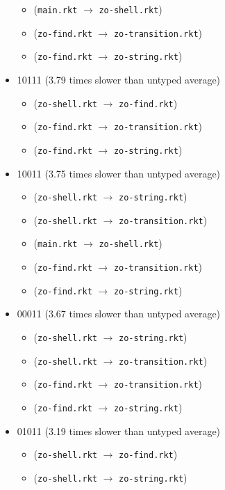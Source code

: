\documentclass{article}
\newcommand{\mono}[1]{\texttt{#1}}
\begin{document}
\begin{itemize}
\begin{itemize}
  \item (\mono{main.rkt} $\rightarrow$ \mono{zo-shell.rkt})
  \item (\mono{zo-find.rkt} $\rightarrow$ \mono{zo-transition.rkt})
  \item (\mono{zo-find.rkt} $\rightarrow$ \mono{zo-string.rkt})
  \end{itemize}
\item 10111 (3.79 times slower than untyped average)
  \begin{itemize}
  \item (\mono{zo-shell.rkt} $\rightarrow$ \mono{zo-find.rkt})
  \item (\mono{zo-find.rkt} $\rightarrow$ \mono{zo-transition.rkt})
  \item (\mono{zo-find.rkt} $\rightarrow$ \mono{zo-string.rkt})
  \end{itemize}
\item 10011 (3.75 times slower than untyped average)
  \begin{itemize}
  \item (\mono{zo-shell.rkt} $\rightarrow$ \mono{zo-string.rkt})
  \item (\mono{zo-shell.rkt} $\rightarrow$ \mono{zo-transition.rkt})
  \item (\mono{main.rkt} $\rightarrow$ \mono{zo-shell.rkt})
  \item (\mono{zo-find.rkt} $\rightarrow$ \mono{zo-transition.rkt})
  \item (\mono{zo-find.rkt} $\rightarrow$ \mono{zo-string.rkt})
  \end{itemize}
\item 00011 (3.67 times slower than untyped average)
  \begin{itemize}
  \item (\mono{zo-shell.rkt} $\rightarrow$ \mono{zo-string.rkt})
  \item (\mono{zo-shell.rkt} $\rightarrow$ \mono{zo-transition.rkt})
  \item (\mono{zo-find.rkt} $\rightarrow$ \mono{zo-transition.rkt})
  \item (\mono{zo-find.rkt} $\rightarrow$ \mono{zo-string.rkt})
  \end{itemize}
\item 01011 (3.19 times slower than untyped average)
  \begin{itemize}
  \item (\mono{zo-shell.rkt} $\rightarrow$ \mono{zo-find.rkt})
  \item (\mono{zo-shell.rkt} $\rightarrow$ \mono{zo-string.rkt})

\end{itemize}
\end{itemize}
\end{document}
